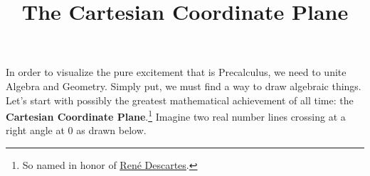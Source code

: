 \documentclass{ximera}
\title{The Cartesian Coordinate Plane} \license{CC BY-NC-SA 4.0}
\begin{document}
\begin{abstract}
\end{abstract}
\maketitle




\label{AppCartesianPlane}


In order to visualize the pure excitement that is Precalculus, we need to unite Algebra and Geometry.  Simply put, we must find a way to draw algebraic things.  Let's start with possibly the greatest mathematical achievement of all time: the  \textbf{Cartesian Coordinate Plane}.\footnote{So named in honor of \href{http://en.wikipedia.org/wiki/Descartes}{\underline{Ren\'{e} Descartes}}.}  Imagine two real number lines crossing at a right angle at $0$ as drawn below.

\begin{center}
\end{center}
\end{document}
